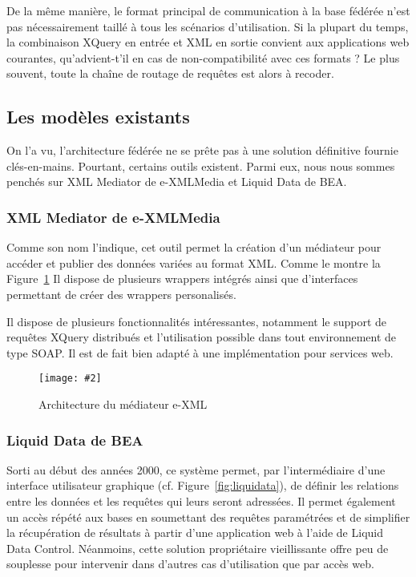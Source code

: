 \documentclass[a4paper,10pt]{article}
\newcommand{\fref}[1]{Figure~\ref{#1}}
\newcommand{\insertfigure}[4]{
\begin{figure}[ht!]
\begin{center}
\texttt{[image: \#2]}
\caption{#3}
\label{#4}
\end{center}
\end{figure}
}
\begin{document}
De la même manière, le format principal de communication à la base fédérée n'est pas nécessairement taillé à tous les scénarios d'utilisation. Si la plupart du temps, la combinaison XQuery en entrée et XML en sortie convient aux applications web courantes, qu'advient-t'il en cas de non-compatibilité avec  ces formats ? Le plus souvent, toute la chaîne de routage de requêtes est alors à recoder.


\subsection{Les modèles existants}
On l'a vu, l'architecture fédérée ne se prête pas à une solution définitive fournie clés-en-mains. Pourtant, certains outils existent. Parmi eux, nous nous sommes penchés sur XML Mediator de e-XMLMedia et Liquid Data de BEA.

\subsubsection{XML Mediator de e-XMLMedia}
Comme son nom l'indique, cet outil permet la création d'un médiateur pour accéder et publier des données variées au format XML. Comme le montre la \fref{fig:xmlmediator} Il dispose de plusieurs wrappers intégrés ainsi que d'interfaces permettant de créer des wrappers personalisés.

Il dispose de plusieurs fonctionnalités intéressantes, notamment le support de requêtes XQuery distribués et l'utilisation possible dans tout environnement de type SOAP. Il est de fait bien adapté à une implémentation pour services web.

\insertfigure{1}{E-XML.png}{Architecture du médiateur e-XML}{fig:xmlmediator}

\subsubsection{Liquid Data de BEA}
Sorti au début des années 2000, ce système permet, par l'intermédiaire d'une interface utilisateur graphique (cf. \fref{fig:liquidata}), de définir les relations entre les données et les requêtes qui leurs seront adressées. Il permet également un accès répété aux bases en soumettant des requêtes paramétrées et de simplifier la récupération de résultats à partir d'une application web à l'aide de Liquid Data Control. Néanmoins, cette solution propriétaire vieillissante offre peu de souplesse pour intervenir dans d'autres cas d'utilisation que par accès web.
\end{document}
